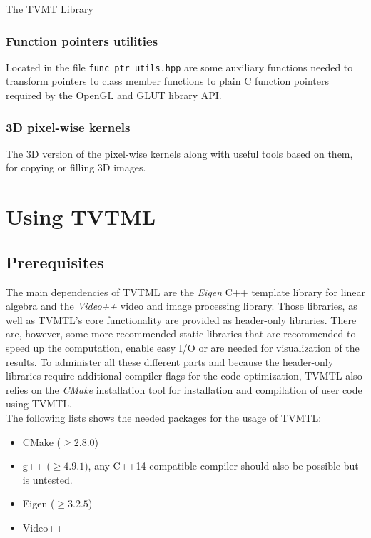 \begin{chapter}{The TVMT Library}

\subsubsection{Function pointers utilities} %
\label{ssub:Function pointers}
Located in the file \texttt{func\_ptr\_utils.hpp} are some auxiliary functions needed to transform pointers to class member functions
to plain C function pointers required by the OpenGL and GLUT library API.

\subsubsection{3D pixel-wise kernels} %
\label{ssub:3D pixel-wise kernels}
The 3D version of the pixel-wise kernels along with useful tools based on them, for copying or filling 3D images.



\section{Using TVTML} %
\label{sec:Using TVTML}

\subsection{Prerequisites} %
\label{sub:Prerequisites}
The main dependencies of TVTML are the \textit{Eigen} C++ template library for linear algebra and the \textit{Video++} video and image processing library. 
Those libraries, as well as TVMTL's core functionality are provided as header-only libraries. There are, however, some more recommended static libraries
that are recommended to speed up the computation, enable easy I/O or are needed for visualization of the results.
To administer all these different parts and because the header-only libraries require additional compiler flags for the code optimization, TVMTL also relies
on the \textit{CMake} installation tool for installation and compilation of user code using TVMTL. \\

The following lists shows the needed packages for the usage of TVMTL:
\begin{itemize}
    \item CMake ($\geq 2.8.0$)
    \item g++ ($\geq 4.9.1$), any C++14 compatible compiler should also be possible but is untested.
    \item Eigen ($\geq 3.2.5$)
    \item Video++
\end{itemize}


\end{chapter}
